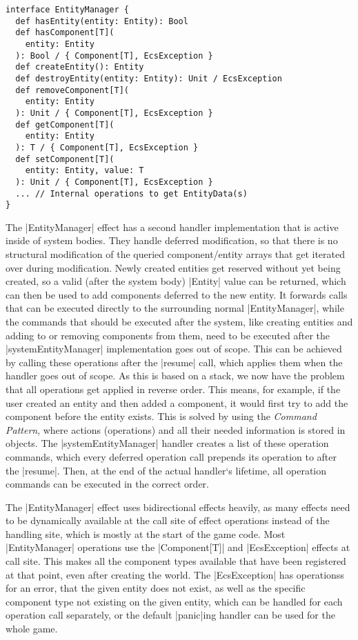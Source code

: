 \begin{lstlisting}[caption=EntityManager signature]
interface EntityManager {
  def hasEntity(entity: Entity): Bool
  def hasComponent[T](
    entity: Entity
  ): Bool / { Component[T], EcsException }
  def createEntity(): Entity
  def destroyEntity(entity: Entity): Unit / EcsException
  def removeComponent[T](
    entity: Entity
  ): Unit / { Component[T], EcsException }
  def getComponent[T](
    entity: Entity
  ): T / { Component[T], EcsException }
  def setComponent[T](
    entity: Entity, value: T
  ): Unit / { Component[T], EcsException }
  ... // Internal operations to get EntityData(s)
}
\end{lstlisting}

The |EntityManager| effect has a second handler implementation that is active inside of system bodies. They handle deferred modification, so that there is no structural modification of the queried component/entity arrays that get iterated over during modification. Newly created entities get reserved without yet being created, so a valid (after the system body) |Entity| value can be returned, which can then be used to add components deferred to the new entity. It forwards calls that can be executed directly to the surrounding normal |EntityManager|, while the commands that should be executed after the system, like creating entities and adding to or removing components from them, need to be executed after the |systemEntityManager| implementation goes out of scope. This can be achieved by calling these operations after the |resume| call, which applies them when the handler goes out of scope. As this is based on a stack, we now have the problem that all operations get applied in reverse order. This means, for example, if the user created an entity and then added a component, it would first try to add the component before the entity exists. This is solved by using the \textit{Command Pattern}, where actions (operations) and all their needed information is stored in objects. The |systemEntityManager| handler creates a list of these operation commands, which every deferred operation call prepends its operation to after the |resume|. Then, at the end of the actual handler`s lifetime, all operation commands can be executed in the correct order.

The |EntityManager| effect uses bidirectional effects heavily, as many effects need to be dynamically available at the call site of effect operations instead of the handling site, which is mostly at the start of the game code. Most |EntityManager| operations use the |Component[T]| and |EcsException| effects at call site. This makes all the component types available that have been registered at that point, even after creating the world. The |EcsException| has operationss for an error, that the given entity does not exist, as well as the specific component type not existing on the given entity, which can be handled for each operation call separately, or the default |panic|ing handler can be used for the whole game.

